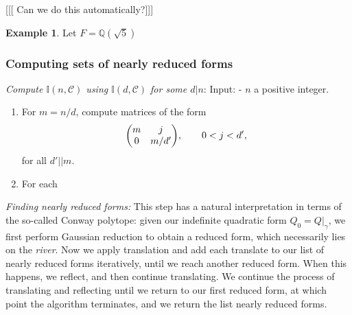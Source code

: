 \documentclass[11pt,a4paper]{article}
\let\mbb\mathbb
\let\mc\mathcal
\newcommand{\Q}{\mathbb{Q}}
\theoremstyle{plain}
\theoremstyle{definition}
\newtheorem{eg}[thm]{Example}
\theoremstyle{remark}
\numberwithin{equation}{section}
\begin{document}
[[[ Can we do this automatically?]]]
\begin{eg}
  Let $F = \Q(\sqrt{5})$
\end{eg}

\subsubsection{Computing sets of nearly reduced forms}
\label{sec:comp-sets-nearly}

\emph{Compute $\mbb I(n,\mc C)$ using $\mbb I(d,\mc C)$ for some $d | n$}:
Input:
- $n$ a positive integer.

\begin{enumerate}
\item For $m = n/d$, compute matrices of the form
  \begin{equation}
    \label{eq:5}
    \mqty(m & j \\ 0 & m/d'), \qq{} 0 < j < d',
  \end{equation}
  for all $d' || m$.
\item For each


\end{enumerate}


\emph{Finding nearly reduced forms:} This step has a natural
interpretation in terms of the so-called Conway polytope: given our
indefinite quadratic form $Q_{0} =Q|_{\gamma}$, we first perform Gaussian
reduction to obtain a reduced form, which necessarily lies on the
\emph{river}. Now we apply translation and add each translate to our
list of nearly reduced forms iteratively, until we reach another
reduced form. When this happens, we reflect, and then continue translating.
We continue the process of translating and reflecting until we return
to our first reduced form, at which point the algorithm terminates,
and we return the list nearly reduced forms.
\end{document}
